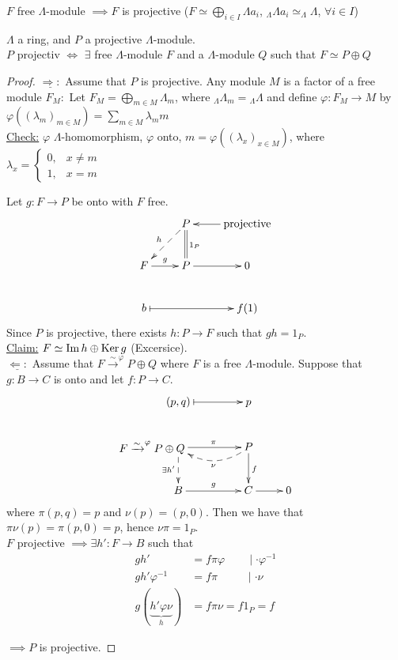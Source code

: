 \begin{exer}
$F$ free $\Lambda$-module $\implies F$ is projective ($F \simeq \bigoplus_{i \in I} \Lambda a_i$, $_\Lambda \Lambda a_i \simeq _\Lambda \Lambda$, $\forall i \in I$)
\end{exer}
\begin{prop}
  $\Lambda$ a ring, and $P$ a projective $\Lambda$-module.\\
  $P$ projectiv $\iff$ $\exists$ free $\Lambda$-module $F$ and a
  $\Lambda$-module $Q$ such that $F \simeq P \oplus Q$
\begin{proof}
  $\underline{\Rightarrow :}$ Assume that $P$ is projective. Any
  module $M$ is a factor of a free module $F_M : $ Let $F_M =
  \bigoplus_{m \in M} \Lambda_m$, where ${_\Lambda\Lambda_m} =
  {_\Lambda\Lambda}$ and define $\varphi: F_M \to M$ by
  $\varphi((\lambda_m)_{m \in M}) = \sum_{m \in M} \lambda_m m$\\ 
\underline{Check:} $\varphi$ $\Lambda$-homomorphism, $\varphi$ onto,
$m = \varphi((\lambda_x)_{x \in M})$, where $\lambda_x = \begin{cases} 
0, & x \neq m\\
1, & x = m
\end{cases}$ 

Let $g: F \to P$ be onto with $F$ free.
$$\xymatrix{
& P\ar@{-->}[ld]_h \ar@{=}[d]^{1_P} & \text{projective} \ar[l]\\
F \ar[r]^g & P \ar[r] & 0\\
b\ar@{|->}[rr] && f(1)
}$$
Since $P$ is projective, there exists $h: P \to F$ such that $gh = 1_P$.\\

\underline{Claim:} $F \simeq \operatorname{Im}\nolimits h \oplus \operatorname{Ker}\nolimits g$ (Excersice).\\

$\underline{\Leftarrow :}$ Assume that $F \xrightarrow{\sim}^\varphi P
\oplus Q$ where $F$ is a free $\Lambda$-module. Suppose that $g: B \to
C$ is onto and let $f: P \to C$.
$$
\xymatrix{
(p, q)\ar@{|->}[r] & p\\
*+[l]{F \xrightarrow{\sim}^\varphi P \oplus Q} \ar[r]^\pi \ar@{-->}[d]_{\exists h'} & P \ar@/^1pc/@{-->}[l]^\nu \ar[d]^f\\
B \ar[r]^g & C \ar[r] & 0
}
$$
where $\pi(p,q) = p$ and $\nu(p) = (p,0)$.  Then we have that
$\pi\nu(p) = \pi(p,0) = p$, hence $\nu\pi = 1_P$.\\
$F$ projective $\implies \exists h': F \to B$ such that 
\begin{equation*}
\begin{split}
gh' &= f\pi \varphi \;\;\;\;\;\;\; \mid \cdot \varphi^{-1}\\
gh'\varphi^{-1} &= f\pi \;\;\;\;\;\;\;\;\; \mid \cdot \nu\\
g(\underbrace{h'\varphi \nu}_h) &= f\pi\nu = f 1_P = f
\end{split}
\end{equation*}

$\implies P$ is projective.
\end{proof}
\end{prop}


